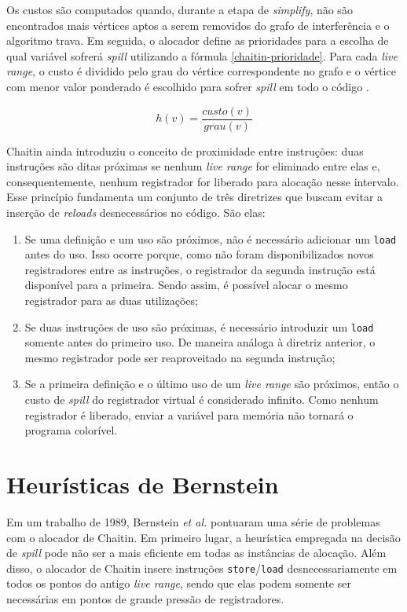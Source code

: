 \documentclass[
	12pt,				%
	openright,			%
	oneside,			%
	a4paper,			%
	tccpreliminar,			%
	]{ABNT-DC-UEL}
\begin{document}
Os custos são computados quando, durante a etapa de \textit{simplify}, não são encontrados mais vértices aptos a serem removidos do grafo de interferência e o algoritmo trava. Em seguida, o alocador define as prioridades para a escolha de qual variável sofrerá \textit{spill} utilizando a fórmula \ref{chaitin-prioridade}. Para cada \textit{live range}, o custo é dividido pelo grau do vértice correspondente no grafo e o vértice com menor valor ponderado é escolhido para sofrer \textit{spill} em todo o código \cite{bernstein:89}.

\begin{equation}
    h(v) = \frac{\textit{custo}(v)}{\textit{grau}(v)}
    \label{chaitin-prioridade}
\end{equation}

Chaitin \cite{chaitin:82} ainda introduziu o conceito de proximidade entre instruções: duas instruções são ditas próximas se nenhum \textit{live range} for eliminado entre elas e, consequentemente, nenhum registrador for liberado para alocação nesse intervalo. Esse princípio fundamenta um conjunto de três diretrizes que buscam evitar a inserção de \textit{reloads} desnecessários no código. São elas:
\begin{enumerate}
    \item Se uma definição e um uso são próximos, não é necessário adicionar um \texttt{load} antes do uso. Isso ocorre porque, como não foram disponibilizados novos registradores entre as instruções, o registrador da segunda instrução está disponível para a primeira. Sendo assim, é possível alocar o mesmo registrador para as duas utilizações;
    \item Se duas instruções de uso são próximas, é necessário introduzir um \texttt{load} somente antes do primeiro uso. De maneira análoga à diretriz anterior, o mesmo registrador pode ser reaproveitado na segunda instrução;
    \item Se a primeira definição e o último uso de um \textit{live range} são próximos, então o custo de \textit{spill} do registrador virtual é considerado infinito. Como nenhum registrador é liberado, enviar a variável para memória não tornará o programa colorível.
\end{enumerate}
    
\section{Heurísticas de Bernstein}

Em um trabalho de 1989, Bernstein \textit{et al.} \cite{bernstein:89} pontuaram uma série de problemas com o alocador de Chaitin. Em primeiro lugar, a heurística empregada na decisão de \textit{spill} pode não ser a mais eficiente em todas as instâncias de alocação. Além disso, o alocador de Chaitin insere instruções \texttt{store}/\texttt{load} desnecessariamente em todos os pontos do antigo \textit{live range}, sendo que elas podem somente ser necessárias em pontos de grande pressão de registradores. 
\end{document}
